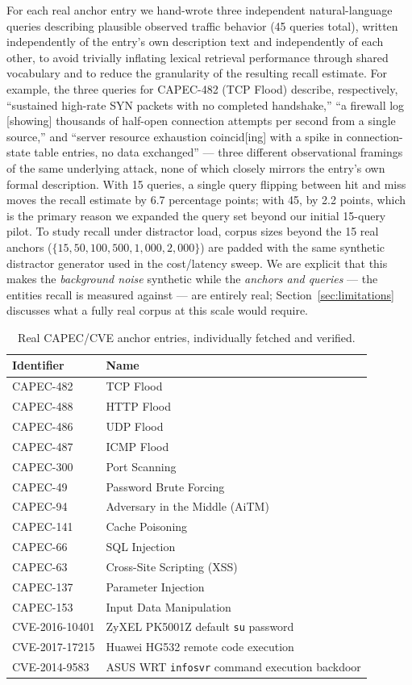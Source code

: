 \documentclass[11pt]{article}
\begin{document}
For each real anchor entry we hand-wrote three independent natural-language queries describing plausible observed traffic behavior (45 queries total), written independently of the entry's own description text and independently of each other, to avoid trivially inflating lexical retrieval performance through shared vocabulary and to reduce the granularity of the resulting recall estimate. For example, the three queries for CAPEC-482 (TCP Flood) describe, respectively, ``sustained high-rate SYN packets with no completed handshake,'' ``a firewall log [showing] thousands of half-open connection attempts per second from a single source,'' and ``server resource exhaustion coincid[ing] with a spike in connection-state table entries, no data exchanged'' --- three different observational framings of the same underlying attack, none of which closely mirrors the entry's own formal description. With 15 queries, a single query flipping between hit and miss moves the recall estimate by 6.7 percentage points; with 45, by 2.2 points, which is the primary reason we expanded the query set beyond our initial 15-query pilot. To study recall under distractor load, corpus sizes beyond the 15 real anchors ($\{15, 50, 100, 500, 1{,}000, 2{,}000\}$) are padded with the same synthetic distractor generator used in the cost/latency sweep. We are explicit that this makes the \emph{background noise} synthetic while the \emph{anchors and queries} --- the entities recall is measured against --- are entirely real; Section~\ref{sec:limitations} discusses what a fully real corpus at this scale would require.

\begin{table}[t]
\centering
\caption{Real CAPEC/CVE anchor entries, individually fetched and verified.}
\label{tab:real-entries}
\small
\begin{tabular}{ll}
\toprule
Identifier & Name \\
\midrule
CAPEC-482 & TCP Flood \\
CAPEC-488 & HTTP Flood \\
CAPEC-486 & UDP Flood \\
CAPEC-487 & ICMP Flood \\
CAPEC-300 & Port Scanning \\
CAPEC-49 & Password Brute Forcing \\
CAPEC-94 & Adversary in the Middle (AiTM) \\
CAPEC-141 & Cache Poisoning \\
CAPEC-66 & SQL Injection \\
CAPEC-63 & Cross-Site Scripting (XSS) \\
CAPEC-137 & Parameter Injection \\
CAPEC-153 & Input Data Manipulation \\
CVE-2016-10401 & ZyXEL PK5001Z default \texttt{su} password \\
CVE-2017-17215 & Huawei HG532 remote code execution \\
CVE-2014-9583 & ASUS WRT \texttt{infosvr} command execution backdoor \\
\bottomrule
\end{tabular}
\end{table}
\end{document}
